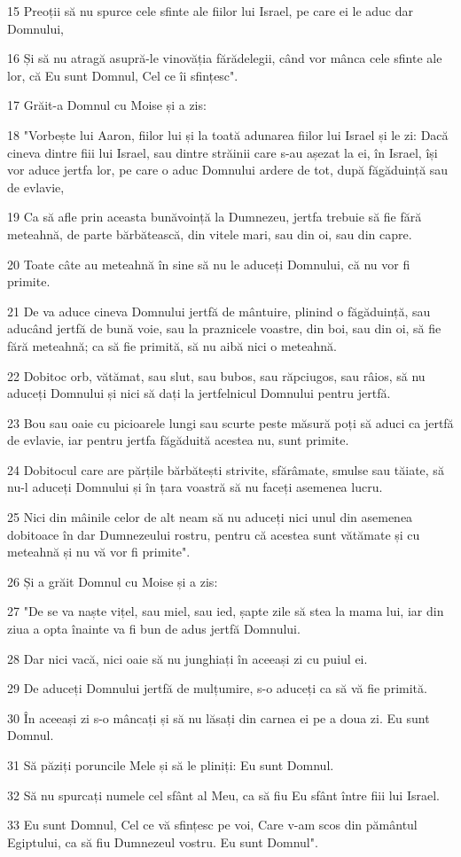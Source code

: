 \par 15 Preoții să nu spurce cele sfinte ale fiilor lui Israel, pe care ei le aduc dar Domnului,
\par 16 Și să nu atragă asupră-le vinovăția fărădelegii, când vor mânca cele sfinte ale lor, că Eu sunt Domnul, Cel ce îi sfințesc".
\par 17 Grăit-a Domnul cu Moise și a zis:
\par 18 "Vorbește lui Aaron, fiilor lui și la toată adunarea fiilor lui Israel și le zi: Dacă cineva dintre fiii lui Israel, sau dintre străinii care s-au așezat la ei, în Israel, își vor aduce jertfa lor, pe care o aduc Domnului ardere de tot, după făgăduință sau de evlavie,
\par 19 Ca să afle prin aceasta bunăvoință la Dumnezeu, jertfa trebuie să fie fără meteahnă, de parte bărbătească, din vitele mari, sau din oi, sau din capre.
\par 20 Toate câte au meteahnă în sine să nu le aduceți Domnului, că nu vor fi primite.
\par 21 De va aduce cineva Domnului jertfă de mântuire, plinind o făgăduință, sau aducând jertfă de bună voie, sau la praznicele voastre, din boi, sau din oi, să fie fără meteahnă; ca să fie primită, să nu aibă nici o meteahnă.
\par 22 Dobitoc orb, vătămat, sau slut, sau bubos, sau răpciugos, sau râios, să nu aduceți Domnului și nici să dați la jertfelnicul Domnului pentru jertfă.
\par 23 Bou sau oaie cu picioarele lungi sau scurte peste măsură poți să aduci ca jertfă de evlavie, iar pentru jertfa făgăduită acestea nu, sunt primite.
\par 24 Dobitocul care are părțile bărbătești strivite, sfărâmate, smulse sau tăiate, să nu-l aduceți Domnului și în țara voastră să nu faceți asemenea lucru.
\par 25 Nici din mâinile celor de alt neam să nu aduceți nici unul din asemenea dobitoace în dar Dumnezeului rostru, pentru că acestea sunt vătămate și cu meteahnă și nu vă vor fi primite".
\par 26 Și a grăit Domnul cu Moise și a zis:
\par 27 "De se va naște vițel, sau miel, sau ied, șapte zile să stea la mama lui, iar din ziua a opta înainte va fi bun de adus jertfă Domnului.
\par 28 Dar nici vacă, nici oaie să nu junghiați în aceeași zi cu puiul ei.
\par 29 De aduceți Domnului jertfă de mulțumire, s-o aduceți ca să vă fie primită.
\par 30 În aceeași zi s-o mâncați și să nu lăsați din carnea ei pe a doua zi. Eu sunt Domnul.
\par 31 Să păziți poruncile Mele și să le pliniți: Eu sunt Domnul.
\par 32 Să nu spurcați numele cel sfânt al Meu, ca să fiu Eu sfânt între fiii lui Israel.
\par 33 Eu sunt Domnul, Cel ce vă sfințesc pe voi, Care v-am scos din pământul Egiptului, ca să fiu Dumnezeul vostru. Eu sunt Domnul".

